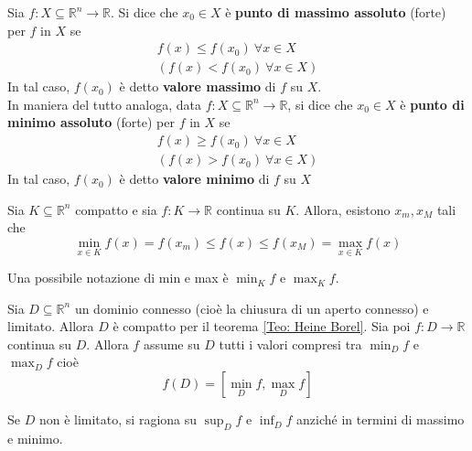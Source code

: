 \begin{definition}
Sia $f:X \subseteq \mathbb{R}^n \to \mathbb{R}$. Si dice che $x_0 \in X$ è \textbf{punto di massimo assoluto} (forte) per $f$ in $X$ se
\begin{equation}
    \begin{aligned}
        f(x) \leq f(x_0) \ \forall x  \in X \\
        (f(x) < f(x_0) \ \forall x  \in X)
    \end{aligned}
\end{equation}
In tal caso, $f(x_0)$ è detto \textbf{valore massimo} di $f$ su $X$.\\
In maniera del tutto analoga, data $f:X \subseteq \mathbb{R}^n \to \mathbb{R}$, si dice che $x_0 \in X$ è \textbf{punto di minimo assoluto} (forte) per $f$ in $X$ se
\begin{equation}
    \begin{aligned}
        f(x) \geq f(x_0) \ \forall x \in X\\
        (f(x)>f(x_0) \ \forall x \in X)
    \end{aligned}
\end{equation}
In tal caso, $f(x_0)$ è detto \textbf{valore minimo} di $f$ su $X$
\end{definition}
\begin{theorem}[Weierstrass] \label{Teo: Weierstrass}
    Sia $K \subseteq \mathbb{R}^n$ compatto e sia $f: K \to \mathbb{R}$ continua su $K$. Allora, esistono $x_m, x_M$ tali che
    \begin{equation}
    \min_{x \in K}{f(x)}= f(x_m) \leq f(x) \leq f(x_M) = \max_{x \in K}{f(x)}    
    \end{equation}
    \begin{oss}
        Una possibile notazione di min e max è $ \min_{K}{f}$ e $\max_{K}{f}$.
    \end{oss}
\end{theorem}
\begin{theorem} \label{Teo: Valori intermedi}
    Sia $D \subseteq \mathbb{R}^n$ un dominio connesso (cioè la chiusura di un aperto connesso) e limitato. Allora $D$ è compatto per il teorema \ref{Teo: Heine Borel}.
    Sia poi $f:D \to \mathbb{R}$ continua su $D$. Allora $f$ assume su $D$ tutti i valori compresi tra $\min_{D}{f}$ e $\max_{D}{f}$ cioè
    \begin{equation}
        f(D)=\left[ \min_{D}{f}, \max_{D}{f}\right]
    \end{equation}
    \begin{oss}
        Se $D$ non è limitato, si ragiona su $\sup_{D}{f}$ e $\inf_{D}{f}$ anziché in termini di massimo e minimo.
    \end{oss}
\end{theorem}
